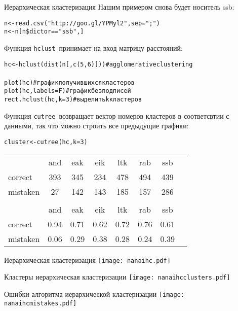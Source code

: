 \begin{frame}{Иерархическая кластеризация}
Нашим примером снова будет носитель ssb:
\scriptsize
\begin{alltt}
n <- read.csv("http://goo.gl/YPMyl2"{}, sep = ";")\\
n <- n[n\$dictor == "ssb"{},]
\end{alltt}
\normalsize
Функция \scriptsize\verb"hclust"\normalsize\ принимает на вход матрицу расстояний:
\scriptsize
\begin{alltt}
\alert{hc <- hclust(dist(n[,c(5,6)])) \hfill  \# agglomerative clustering\\}
plot(\alert{hc}) \hfill \# график получившихся кластеров\\
plot(\alert{hc}, labels = F) \hfill  \# график без подписей\\
\alert{rect.hclust(\alert{hc}, k=3) \hfill \# выделить k кластеров}
\end{alltt}
\normalsize
Функция \scriptsize\verb"cutree"\normalsize\ возвращает вектор номеров кластеров в соответсвтии с данными, так что можно строить все предыдущие графики:
\scriptsize
\begin{alltt}
cluster <- \alert{cutree(}hc, k=3\alert{)}
\end{alltt}
\normalsize
\begin{center}
\small
\begin{tabular}{lccccccc}
 & and & eak & eik & ltk& rab & ssb \\ 
correct & 393 & 345 & 234 & 478 &494 & 439 \\ 
mistaken & 27 & 142 & 143 & 185 & 157 & 286 \\ 
 &  &  &  &  & & \\ 
 & and & eak & eik & ltk&rab & ssb \\ 
correct & 0.94 & 0.71 & 0.62 & 0.72 & 0.76 & 0.61 \\ 
mistaken & 0.06 & 0.29 & 0.38 & 0.28 & 0.24 & 0.39 \\ 
\end{tabular}
\normalsize
\end{center}
\end{frame}

\begin{frame}{Иерархическая кластеризация}
\texttt{[image: nanaihc.pdf]}
\end{frame}
\begin{frame}{Кластеры иерархическая кластеризации}
\texttt{[image: nanaihcclusters.pdf]}
\end{frame}
\begin{frame}{Ошибки алгоритма иерархической кластеризации}
\texttt{[image: nanaihcmistakes.pdf]}
\end{frame}
